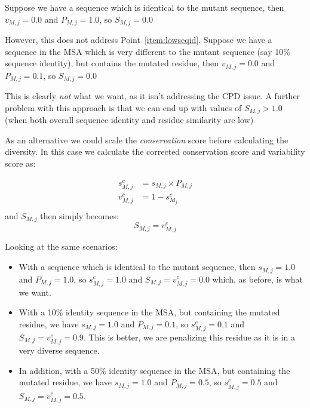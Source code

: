 \documentclass[a4paper]{article}
\begin{document}
Suppose we have a sequence which is identical to the
mutant sequence, then $v_{M, j} = 0.0$ and $P_{M, j} = 1.0$, so
$S_{M,j} = 0.0$

However, this does not address Point~\ref{item:lowseqid}.
Suppose we have a sequence in the MSA which is very different to the mutant
sequence (say 10\% sequence identity), but contains the mutated
residue, then $v_{M, j} = 0.0$ and $P_{M, j} = 0.1$, so $S_{M,j} =
0.0$

This is clearly \emph{not} what we want, as it isn't addressing the CPD
issue. A further problem with this approach is that we can end up with
values of $S_{M,j} > 1.0$ (when both overall sequence identity and
residue similarity are low)

As an alternative we could scale the \emph{conservation} score before
calculating the diversity. In this case we calculate the corrected
conservation score and variability score as:

\begin{equation}
  \begin{array}{ll}
    s^c_{M,j} & = s_{M,j} \times P_{M, j} \\
    v^c_{M,j} & = 1 - s^c_{M_j} \\
  \end{array}
\end{equation}
and $S_{M,j}$ then simply becomes:
\begin{equation}
  S_{M,j} = v^c_{M, j}
\end{equation}

Looking at the same scenarios:

\begin{itemize}  
\item With a sequence which is identical to the mutant sequence, then
  $s_{M, j} = 1.0$ and $P_{M, j} = 1.0$, so $s^c_{M,j} = 1.0$ and
  $S_{M,j} = v^c_{M,j} = 0.0$ which, as before, is what we want.

\item With a 10\% identity sequence in the MSA, but containing the
  mutated residue, we have $s_{M, j} = 1.0$ and $P_{M, j} = 0.1$, so
  $s^c_{M,j} = 0.1$ and $S_{M,j} = v^c_{M,j} = 0.9$. This is
  better, we are penalizing this residue as it is in a very diverse
  sequence.

\item In addition, with a 50\% identity sequence in the MSA, but
  containing the mutated residue, we have $s_{M, j} = 1.0$ and $P_{M,
    j} = 0.5$, so $s^c_{M,j} = 0.5$ and $S_{M,j} = v^c_{M,j} =
  0.5$.
\end{itemize}  
\end{document}
